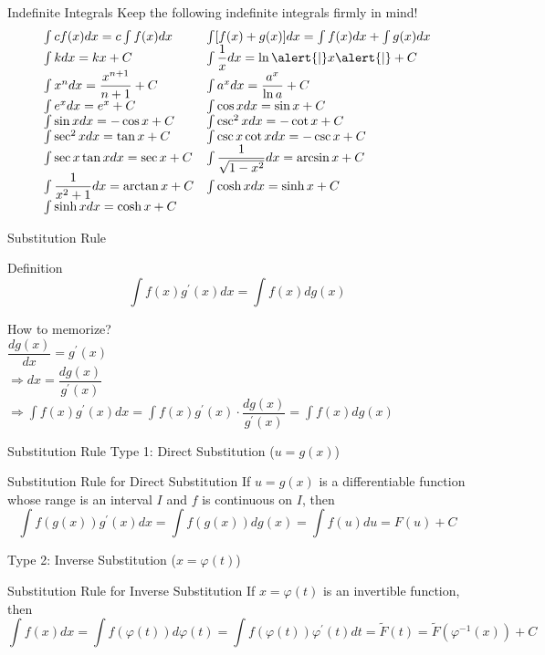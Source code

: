 \documentclass{beamer}
\begin{document}
\begin{frame}{Indefinite Integrals}
Keep the following indefinite integrals firmly in mind!\\
$$
\begin{array}{ll}
\int c f(x) d x=c \int f(x) d x & \int[f(x)+g(x)] d x=\int f(x) d x+\int g(x) d x \\
\int k d x=k x+C & \int \dfrac{1}{x} d x=\ln \alert{|}x\alert{|}+C \\
\int x^{n} d x=\dfrac{x^{n+1}}{n+1}+C & \int a^{x} d x=\dfrac{a^{x}}{\ln a}+C \\
\int e^{x} d x=e^{x}+C & \int \cos x d x=\sin x+C \\
\int \sin x d x=-\cos x+C & \int \csc ^{2} x d x=-\cot x+C \\
\int \sec ^{2} x d x=\tan x+C & \int \csc x \cot x d x=-\csc x+C \\
\int \sec x \tan x d x=\sec x+C & \int \dfrac{1}{\sqrt{1-x^{2}}} d x=\arcsin x+C \\
\int \dfrac{1}{x^{2}+1} d x=\arctan x+C & \int \cosh x d x=\sinh x+C \\
\int \sinh x d x=\cosh x+C 
\end{array}
$$
\end{frame}

\begin{frame}{Substitution Rule}
    \begin{block}{Definition}
    $$
\int f(x) g^{\prime}(x) dx= \int f(x)dg(x)
$$
    \end{block}
    How to memorize?\\
    $\dfrac{dg(x)}{dx}=g^{\prime}(x)$\\$\Rightarrow dx=\dfrac{dg(x)}{g^{\prime}(x)}$\\$\Rightarrow \int f(x) g^{\prime}(x) dx= \int f(x)g^{\prime}(x)\cdot \dfrac{dg(x)}{g^{\prime}(x)}=\int f(x)dg(x)$
\end{frame}

\begin{frame}{Substitution Rule}
Type 1: Direct Substitution ($u=g(x)$)
\begin{block}{Substitution Rule for Direct Substitution}
If $u=g(x)$ is a differentiable function whose range is an interval $I$ and $f$ is continuous on $I$, then
$$
\int f(g(x)) g^{\prime}(x) dx= \int f(g(x))dg(x)=\int f(u) d u=F(u)+C
$$
\end{block}
Type 2: Inverse Substitution ($x=\varphi(t)$)
\begin{block}{Substitution Rule for Inverse Substitution}
If $x=\varphi(t)$ is an invertible function, then
$$
\int f(x)dx = \int f(\varphi (t))d\varphi (t)=\int f(\varphi (t))\varphi ^{\prime}(t)dt=\widetilde{F}(t)=\widetilde{F}(\varphi ^{-1}(x))+C
$$
\end{block}
\end{frame}
\end{document}
